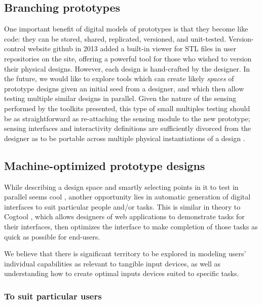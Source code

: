 \subsection{Branching prototypes}

One important benefit of digital models of prototypes is that they become like code: they can be stored, shared, replicated, versioned, and unit-tested. Version-control website github \cite{github} in 2013 added a built-in viewer for STL files in user repositories on the site, offering a powerful tool for those who wished to version their physical designs. However, each design is hand-crafted by the designer. In the future, we would like to explore tools which can create likely \emph{spaces} of prototype designs given an initial seed from a designer, and which then allow testing multiple similar designs in parallel. Given the nature of the sensing performed by the toolkits presented, this type of small multiples testing should be as straightforward as re-attaching the sensing module to the new prototype; sensing interfaces and interactivity definitions are sufficiently divorced from the designer as to be portable across multiple physical instantiations of a design .

\subsection{Machine-optimized prototype designs}

While describing a design space and smartly selecting points in it to test in parallel seems cool , another opportunity lies in automatic generation of digital interfaces to suit particular people and/or tasks. This is similar in theory to Cogtool \cite{john-cogtool}, which allows designers of web applications to demonstrate tasks for their interfaces, then optimizes the interface to make completion of those tasks as quick as possible for end-users.

We believe that there is significant territory to be explored in modeling users' individual capabilities as relevant to tangible input devices, as well as understanding how to create optimal inputs devices suited to specific tasks.

    \subsubsection{To suit particular users}

